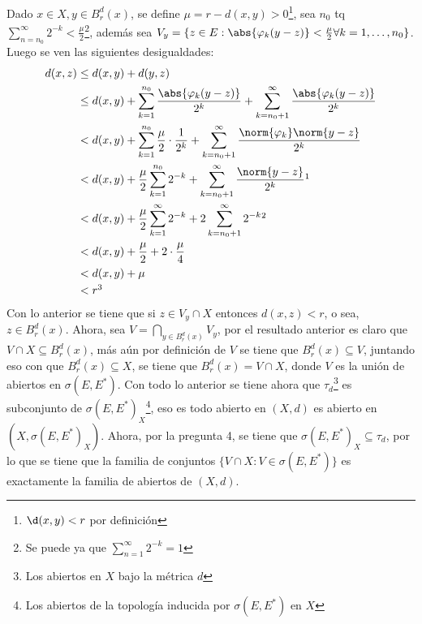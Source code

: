 \documentclass{homework}
\begin{document}
\begin{sol}
    Dado \(x\in X,y\in B_r^d(x)\), se define \(\mu=r-d(x,y)>0\)\footnote{\(\d(x,y)<r\) por definición}, sea \(n_0\) tq \(\sum_{n=n_0}^\infty2^{-k}<\frac\mu2\)\footnote{Se puede ya que \(\sum_{n=1}^\infty2^{-k}=1\)}, además sea \(V_y=\{z\in E:\abs{\varphi_k(y-z)}<\frac\mu2\forall k=1,\dots,n_0\}\). Luego se ven las siguientes desigualdades:
    \begin{align*}
        d(x,z)&\leq d(x,y)+d(y,z)\\
        &\leq d(x,y)+\sum_{k=1}^{n_0}\frac{\abs{\varphi_k(y-z)}}{2^k}+\sum_{k=n_0+1}^\infty\frac{\abs{\varphi_k(y-z)}}{2^k}\\
        &<d(x,y)+\sum_{k=1}^{n_0}\frac\mu2\cdot\frac1{2^k}+\sum_{k=n_0+1}^\infty\frac{\norm{\varphi_k}\norm{y-z}}{2^k}\\
        &<d(x,y)+\frac\mu2\sum_{k=1}^{n_0}2^{-k}+\sum_{k=n_0+1}^\infty\frac{\norm{y-z}}{2^k}\footnotemark\\
        &<d(x,y)+\frac\mu2\sum_{k=1}^\infty2^{-k}+2\sum_{k=n_0+1}^\infty2^{-k}\footnotemark\\
        &<d(x,y)+\frac\mu2+2\cdot\frac\mu4\\
        &<d(x,y)+\mu\\
        &<r\footnotemark
    \end{align*}
    Con lo anterior se tiene que si \(z\in V_y\cap X\) entonces \(d(x,z)<r\), o sea, \(z\in B_r^d(x)\). Ahora, sea \(V=\bigcap_{y\in B_r^d(x)}V_y\), por el resultado anterior es claro que \(V\cap X\subseteq B_r^d(x)\), más aún por definición de \(V\) se tiene que \(B_r^d(x)\subseteq V\), juntando eso con que \(B_r^d(x)\subseteq X\), se tiene que \(B_r^d(x)=V\cap X\), donde \(V\) es la unión de abiertos en \(\sigma(E,E^*)\). Con todo lo anterior se tiene ahora que \(\tau_d\)\footnote{Los abiertos en \(X\) bajo la métrica \(d\)} es subconjunto de \(\sigma(E,E^*)_X\)\footnote{Los abiertos de la topología inducida por \(\sigma(E,E^*)\) en \(X\)}, eso es todo abierto en \((X,d)\) es abierto en \((X,\sigma(E,E^*)_X)\). Ahora, por la pregunta 4, se tiene que \(\sigma(E,E^*)_X\subseteq\tau_d\), por lo que se tiene que la familia de conjuntos \(\{V\cap X:V\in\sigma(E,E^*)\}\) es exactamente la familia de abiertos de \((X,d)\).
\end{sol}
\end{document}

